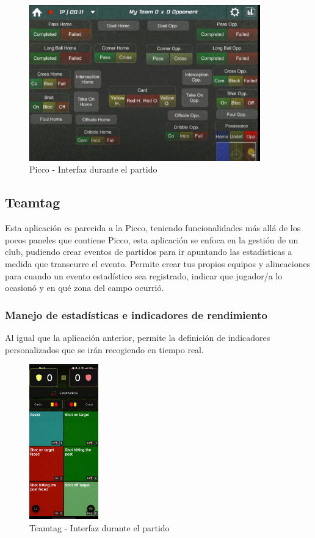 \begin{figure}[H]
    \centering
    \includegraphics[width=10cm]{archivos/tfg_jorge/picco_ui_partidos}
    \caption{Picco - Interfaz durante el partido}\label{sistemass2}
\end{figure}

\subsection{Teamtag}
Esta aplicación es parecida a la Picco, teniendo funcionalidades más allá de los pocos paneles que contiene Picco, esta aplicación se enfoca en la gestión de un club, pudiendo crear eventos de partidos para ir apuntando las estadísticas a medida que transcurre el evento. Permite crear tus propios equipos y alineaciones para cuando un evento estadístico sea registrado, indicar que jugador/a lo ocasionó y en qué zona del campo ocurrió.

\subsubsection{Manejo de estadísticas e indicadores de rendimiento}
Al igual que la aplicación anterior, permite la definición de indicadores personalizados que se irán recogiendo en tiempo real.

\begin{figure}[H]
    \centering
    \includegraphics[width=3cm]{archivos/tfg_jorge/teamtag_movil_ui}
    \caption{Teamtag - Interfaz durante el partido}\label{sistemass2}
\end{figure}

